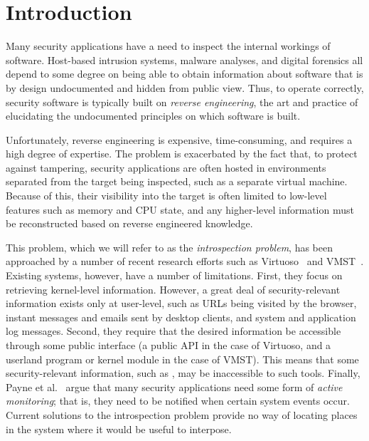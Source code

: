 \section{Introduction}
\label{sec:introduction}

Many security applications have a need to inspect the internal workings
of software. Host-based intrusion systems, malware analyses, and
digital forensics all depend to some degree on being able to obtain
information about software that is by design undocumented and hidden
from public view. Thus, to operate correctly, security software is
typically built on \emph{reverse engineering}, the art and practice of
elucidating the undocumented principles on which software is built.

Unfortunately, reverse engineering is expensive, time-consuming, and
requires a high degree of expertise. The problem is exacerbated by the
fact that, to protect against tampering, security applications are often
hosted in environments separated from the target being inspected, such
as a separate virtual machine. Because of this, their visibility into
the target is often limited to low-level features such as memory and CPU
state, and any higher-level information must be reconstructed based on
reverse engineered knowledge.

This problem, which we will refer to as the \emph{introspection
problem}, has been approached by a number of recent research efforts
such as Virtuoso~\cite{Dolan-Gavitt:2011uq} and VMST~\cite{Fu:2012fk}.
Existing systems, however, have a number of limitations. First, they
focus on retrieving kernel-level information. However, a great deal of
security-relevant information exists only at user-level, such as URLs
being visited by the browser, instant messages and emails sent by
desktop clients, and system and application log messages. Second,
they require that the desired information be accessible through some
public interface (a public API in the case of Virtuoso, and a userland
program or kernel module in the case of VMST). This means that some
security-relevant information, such as , may be
inaccessible to such tools. Finally, Payne et al.~\cite{payne:2008}
argue that many security applications need some form of \emph{active
monitoring}; that is, they need to be notified when certain system
events occur. Current solutions to the introspection problem provide no
way of locating places in the system where it would be useful to
interpose.

